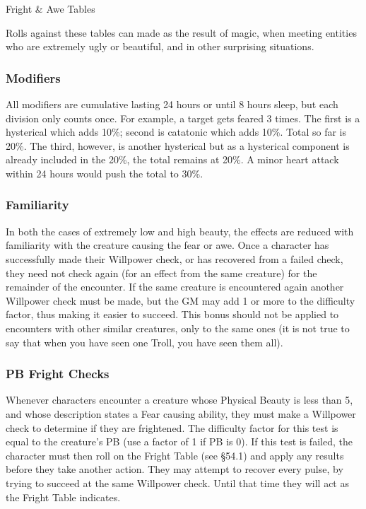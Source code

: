 \begin{Tables}{Fright \& Awe Tables}

\begin{multicols}{3}
    
Rolls against these tables can made as the result of magic, when
meeting entities who are extremely ugly or beautiful, and in other
surprising situations.

\subsubsection{Modifiers}

All modifiers are cumulative lasting 24 hours or until 8 hours sleep,
but each division only counts once.  For example, a target gets feared
3 times.  The first is a hysterical which adds 10\%; second is
catatonic which adds 10\%.  Total so far is 20\%.  The third, however,
is another hysterical but as a hysterical component is already
included in the 20\%, the total remains at 20\%.  A minor heart attack
within 24 hours would push the total to 30\%.

\subsubsection{Familiarity}

In both the cases of extremely low and high beauty, the effects are
reduced with familiarity with the creature causing the fear or awe.
Once a character has successfully made their Willpower check, or has
recovered from a failed check, they need not check again (for an
effect from the same creature) for the remainder of the encounter.  If
the same creature is encountered again another Willpower check must be
made, but the GM may add 1 or more to the difficulty factor, thus
making it easier to succeed.  This bonus should not be applied to
encounters with other similar creatures, only to the
same ones (it is not true to say that when you have 
seen one Troll, you have seen them all). 

\subsubsection{PB Fright Checks}

Whenever characters encounter a creature whose Physical Beauty is less
than 5, and whose description states a Fear causing ability, they must
make a Willpower check to determine if they are frightened.  The
difficulty factor for this test is equal to the creature’s PB (use a
factor of 1 if PB is 0).  If this test is failed, the character must
then roll on the Fright Table (see §54.1) and apply any results before
they take another action. They may attempt to recover every pulse, by
trying to succeed at the same Willpower check.  Until that time they
will act as the Fright Table indicates.


\end{multicols}
\end{Tables}
